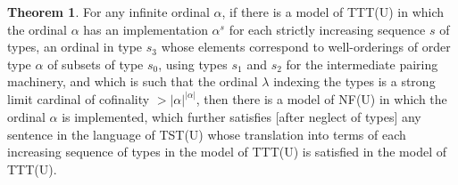\documentclass[112pt]{article}
\theoremstyle{definition}
\newtheorem{theorem}{Theorem}[section]
\theoremstyle{remark}
\begin{document}
\begin{theorem}

For any infinite ordinal $\alpha$, if there is a model of TTT(U) in which the ordinal $\alpha$ has an implementation $\alpha^s$ for each strictly increasing sequence $s$ of types, an ordinal in type $s_3$ whose elements correspond to well-orderings of order type $\alpha$ of subsets of type $s_0$, using types $s_1$ and $s_2$ for the intermediate pairing machinery, and which is such that the ordinal $\lambda$ indexing the types is a strong limit cardinal of cofinality $>|\alpha|^{|\alpha|}$, then there is a model of NF(U) in which the ordinal $\alpha$ is implemented, which further satisfies [after neglect of types] any sentence in the language of TST(U)  whose translation into terms of each increasing sequence of types in the model of TTT(U) is satisfied in the model of TTT(U).

\end{theorem}
\end{document}
